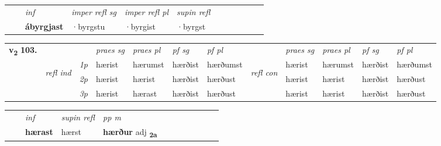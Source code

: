 \begin{tabular}{llllllllllll}
 & & \textit{inf}   & \textit{imper refl sg} & \textit{imper refl pl}   & \textit{supin refl}      \\*
  & & \textbf{ábyrgjast}    & ·byrgstu & ·byrgist   & ·byrgst  \\*
\cmidrule{1-12}
\end{tabular}



\begin{tabular}{llllllllllll} \toprule
\multirow{4}{*}{{{\textbf{v{\textsubscript{2}}} \Large{\textbf{103.}}}}}  & &   &  \textit{praes sg}  & \textit{praes pl}  &\textit{pf sg} & \textit{pf pl} &  &  \textit{praes sg}  & \textit{praes pl}  & \textit{pf sg} & \textit{pf pl } \\*
	\cmidrule{4-7} \cmidrule{9-12}
 &\multirow{3}{*}{\begin{turn}{90}\textit{refl ind}\end{turn}} & {\textit{1p}} & hærist & hærumst    & hærðist & hærðumst & \multirow{3}{*}{\begin{turn}{90}\textit{refl con}\end{turn}}  &hærist & hærumst & hærðist & hærðumst\\*
 &&  {\textit{2p}} &  hærist  & hærist   & hærðist & hærðust & &hærist & hærist & hærðist & hærðust \\*
& &  {\textit{3p}} & hærist & hærast   & hærðist & hærðust & & hærist & hærist& hærðist & hærðust  \\*
\cmidrule{4-7} \cmidrule{9-12}
\end{tabular}


\begin{tabular}{llllllllllll}
 & & \textit{inf}       & \textit{supin refl} & \textit{pp m}     \\*
  & & \textbf{hærast}        & hærst & \textbf{hærður} adj \textbf{\textsubscript{2a}} \\*
\cmidrule{1-12}
\end{tabular}



